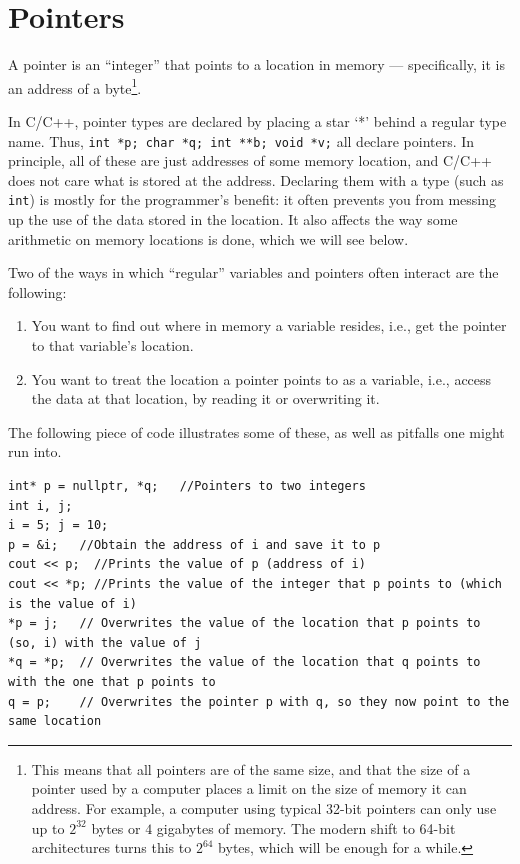 \section{Pointers}
A pointer is an ``integer'' that points to a location in memory ---
specifically, it is an address of a byte\footnote{This means that all
pointers are of the same size, and that the size of a pointer used by
a computer places a limit on the size of memory it can address.
For example, a computer using typical 32-bit pointers can only use up to
$2^{32}$ bytes or $4$ gigabytes of memory.
The modern shift to 64-bit architectures turns this to $2^{64}$ bytes,
which will be enough for a while.}. 

In C/C++, pointer types are declared by placing a star `*' behind a
regular type name.
Thus, \texttt{int *p; char *q; int **b; void *v;} all declare pointers.
In principle, all of these are just addresses of some memory location,
and C/C++ does not care what is stored at the address.
Declaring them with a type (such as \texttt{int}) is mostly for the
programmer's benefit:
it often prevents you from messing up the use of the
data stored in the location.
It also affects the way some arithmetic on memory locations is done,
which we will see below.

Two of the ways in which ``regular'' variables and pointers often
interact are the following:
\begin{enumerate}
\item You want to find out where in memory a variable resides, i.e.,
  get the pointer to that variable's location.
\item You want to treat the location a pointer points to as a variable,
  i.e., access the data at that location, by reading it or overwriting
  it.
\end{enumerate}
The following piece of code illustrates some of these, as well as
pitfalls one might run into.

\begin{verbatim}
int* p = nullptr, *q;	//Pointers to two integers
int i, j;
i = 5; j = 10;
p = &i;	  //Obtain the address of i and save it to p
cout << p;  //Prints the value of p (address of i)
cout << *p; //Prints the value of the integer that p points to (which is the value of i)
*p = j;   // Overwrites the value of the location that p points to (so, i) with the value of j
*q = *p;  // Overwrites the value of the location that q points to with the one that p points to
q = p;    // Overwrites the pointer p with q, so they now point to the same location
\end{verbatim}

